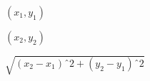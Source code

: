 \documentclass{article}
\begin{document}
$(x_1,y_1)$
\pagebreak

$(x_2,y_2)$
\pagebreak

$\sqrt{(x_2-x_1)ˆ2+(y_2-y_1)ˆ2}$
\pagebreak
\end{document}
